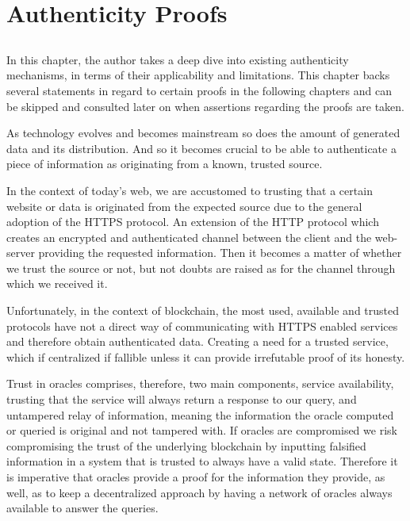 \chapter{Authenticity Proofs}\label{chap:chap3}

\section*{}

In this chapter, the author takes a deep dive into existing authenticity mechanisms, in terms of their applicability and limitations. This chapter backs several statements in regard to certain proofs in the following chapters and can be skipped and consulted later on when assertions regarding the proofs are taken.

As technology evolves and becomes mainstream so does the amount of generated data and its distribution. And so it becomes crucial to be able to authenticate a piece of information as originating from a known, trusted source.

In the context of today's web, we are accustomed to trusting that a certain website or data is originated from the expected source due to the general adoption of the HTTPS protocol. An extension of the HTTP protocol which creates an encrypted and authenticated channel between the client and the web-server providing the requested information. Then it becomes a matter of whether we trust the source or not, but not doubts are raised as for the channel through which we received it.

Unfortunately, in the context of blockchain, the most used, available and trusted protocols have not a direct way of communicating with HTTPS enabled services and therefore obtain authenticated data. Creating a need for a trusted service, which if centralized if fallible unless it can provide irrefutable proof of its honesty.

Trust in oracles comprises, therefore, two main components, service availability, trusting that the service will always return a response to our query, and untampered relay of information, meaning the information the oracle computed or queried is original and not tampered with. If oracles are compromised we risk compromising the trust of the underlying blockchain by inputting falsified information in a system that is trusted to always have a valid state. Therefore it is imperative that oracles provide a proof for the information they provide, as well, as to keep a decentralized approach by having a network of oracles always available to answer the queries.

